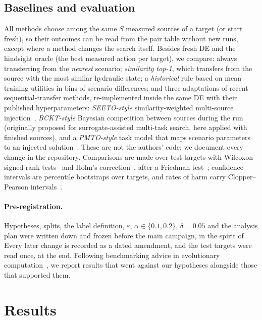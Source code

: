 \documentclass[11pt]{article}
\begin{document}
\subsection{Baselines and evaluation}

All methods choose among the same $S$ measured sources of a target (or start fresh), so their outcomes can be read
from the pair table without new runs, except where a method changes the search itself. Besides fresh DE and the
hindsight oracle (the best measured action per target), we compare: always transferring from the \emph{nearest}
scenario; \emph{similarity top-1}, which transfers from the source with the most similar hydraulic state; a
\emph{historical} rule based on mean training utilities in bins of scenario differences; and three adaptations of
recent sequential-transfer methods, re-implemented inside the same DE with their published hyperparameters:
\emph{SEETO-style} similarity-weighted multi-source injection~\citep{fang2026seeto}, \emph{BCKT-style} Bayesian
competition between sources during the run~\citep{lu2025bckt} (originally proposed for surrogate-assisted multi-task
search, here applied with finished sources), and a \emph{PMTO-style} task model that maps
scenario parameters to an injected solution~\citep{wei2025pmto}. These are not the authors' code; we document every
change in the repository. Comparisons are made over test targets with Wilcoxon signed-rank tests~\citep{wilcoxon1945individual}
and Holm's correction~\citep{holm1979simple}, after a Friedman test~\citep{friedman1937ranks}; confidence intervals are
percentile bootstraps over targets, and rates of harm carry Clopper--Pearson intervals~\citep{clopper1934binomial}.

\paragraph{Pre-registration.} Hypotheses, splits, the label definition, $\varepsilon$, $\alpha\in\{0.1,0.2\}$, $\delta=0.05$
and the analysis plan were written down and frozen before the main campaign, in the spirit of
\citet{nosek2018preregistration}. Every later change is recorded as a dated amendment, and the test targets were read
once, at the end. Following benchmarking advice in evolutionary computation~\citep{bartzbeielstein2020benchmarking},
we report results that went against our hypotheses alongside those that supported them.

\section{Results}\label{sec:results}
\end{document}
